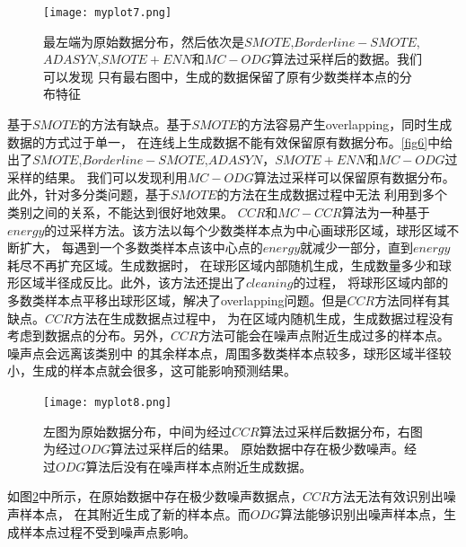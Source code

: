 \documentclass{article}
\begin{document}
\begin{figure}
  \centering
  \texttt{[image: myplot7.png]}
  \caption{最左端为原始数据分布，然后依次是$SMOTE$,$Borderline-SMOTE$,$ADASYN$,$SMOTE+ENN$和$MC-ODG$算法过采样后的数据。我们可以发现
  只有最右图中，生成的数据保留了原有少数类样本点的分布特征}
  \label{fig7}
\end{figure}
基于$SMOTE$的方法有缺点。基于$SMOTE$的方法容易产生overlapping，同时生成数据的方式过于单一，
在连线上生成数据不能有效保留原有数据分布。\ref{fig6}中给出了$SMOTE$,$Borderline-SMOTE$,$ADASYN$，$SMOTE+ENN$和$MC-ODG$过采样的结果。
我们可以发现利用$MC-ODG$算法过采样可以保留原有数据分布。此外，针对多分类问题，基于$SMOTE$的方法在生成数据过程中无法
利用到多个类别之间的关系，不能达到很好地效果。
$CCR$和$MC-CCR$算法为一种基于$energy$的过采样方法。该方法以每个少数类样本点为中心画球形区域，球形区域不断扩大，
每遇到一个多数类样本点该中心点的$energy$就减少一部分，直到$energy$耗尽不再扩充区域。生成数据时，
在球形区域内部随机生成，生成数量多少和球形区域半径成反比。此外，该方法还提出了$cleaning$的过程，
将球形区域内部的多数类样本点平移出球形区域，解决了overlapping问题。但是$CCR$方法同样有其缺点。$CCR$方法在生成数据点过程中，
为在区域内随机生成，生成数据过程没有考虑到数据点的分布。另外，$CCR$方法可能会在噪声点附近生成过多的样本点。噪声点会远离该类别中
的其余样本点，周围多数类样本点较多，球形区域半径较小，生成的样本点就会很多，这可能影响预测结果。
\begin{figure}
  \centering
  \texttt{[image: myplot8.png]}
  \caption{左图为原始数据分布，中间为经过$CCR$算法过采样后数据分布，右图为经过$ODG$算法过采样后的结果。
  原始数据中存在极少数噪声。经过$ODG$算法后没有在噪声样本点附近生成数据。}
  \label{fig8}
\end{figure}
如图\ref{fig8}中所示，在原始数据中存在极少数噪声数据点，$CCR$方法无法有效识别出噪声样本点，
在其附近生成了新的样本点。而$ODG$算法能够识别出噪声样本点，生成样本点过程不受到噪声点影响。
\end{document}
